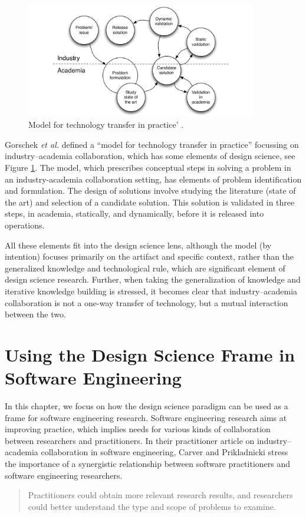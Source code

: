 \documentclass[graybox]{svmult}
\begin{document}
\begin{figure}[t]
  \includegraphics[width=0.9\textwidth]{Figures/GorschekModel.pdf}
\caption{Model for technology transfer in practice' \cite{GorschekSW2006}.}
\label{fig:GorschekModel}       %
\end{figure}

Gorschek \emph{et al.} defined a ``model for technology transfer in practice'' \cite{GorschekSW2006} focussing on industry--academia collaboration, which has some elements of design science, see Figure \ref{fig:GorschekModel}. The model, which prescribes conceptual steps in solving a problem in an industry-academia collaboration setting, has elements of problem identification and formulation. The design of solutions involve studying the literature (state of the art) and selection of a candidate solution. This solution is validated in three steps, in academia, statically, and dynamically, before it is released into operations. 

All these elements fit into the design science lens, although the model (by intention) focuses primarily on the artifact and specific context, rather than the generalized knowledge and technological rule, which are significant element of design science research. Further, when taking the generalization of knowledge and iterative knowledge building is stressed, it becomes clear that industry--academia collaboration is not a one-way transfer of technology, but a mutual interaction between the two.


\section{Using the Design Science Frame in Software Engineering}
\label{sec:UsingDSinSE}


In this chapter, we focus on how the design science paradigm can be used as a frame for software engineering research. Software engineering research aims at improving practice, which implies needs for various kinds of collaboration between researchers and practitioners. In their practitioner article on industry--academia collaboration in software engineering, Carver and Prikladnicki stress the importance of a synergistic relationship between software practitioners and software engineering researchers.
\begin{quote}Practitioners could obtain more relevant research results, and researchers could better understand the type and scope of problems to examine.~\cite{CarverIEEESW2018}
\end{quote} 
\end{document}
